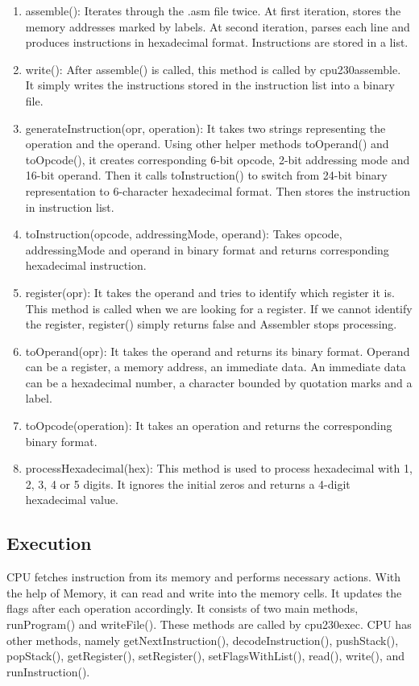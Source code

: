 \documentclass[12pt,a4paper]{article}
\begin{document}
\begin{enumerate}
    \item assemble(): Iterates through the .asm file twice. At first iteration, stores the memory addresses marked by labels. At second iteration, parses each line and produces instructions in hexadecimal format. Instructions are stored in a list.
    \item write(): After assemble() is called, this method is called by cpu230assemble. It simply writes the instructions stored in the instruction list into a binary file.
    \item generateInstruction(opr, operation): It takes two strings representing the operation and the operand. Using other helper methods toOperand() and toOpcode(), it creates corresponding 6-bit opcode, 2-bit addressing mode and 16-bit operand. Then it calls toInstruction() to switch from 24-bit binary representation to 6-character hexadecimal format. Then stores the instruction in instruction list.
    \item toInstruction(opcode, addressingMode, operand): Takes opcode, addressingMode and operand in binary format and returns corresponding hexadecimal instruction.
    \item register(opr): It takes the operand and tries to identify which register it is. This method is called when we are looking for a register. If we cannot identify the register, register() simply returns false and Assembler stops processing.
    \item toOperand(opr): It takes the operand and returns its binary format. Operand can be a register, a memory address, an immediate data. An immediate data can be a hexadecimal number, a character bounded by quotation marks and a label.
    \item toOpcode(operation): It takes an operation and returns the corresponding binary format.
    \item processHexadecimal(hex): This method is used to process hexadecimal with 1, 2, 3, 4 or 5 digits. It ignores the initial zeros and returns a 4-digit hexadecimal value.
\end{enumerate}

\subsection{Execution}

CPU fetches instruction from its memory and performs necessary actions. With the help of Memory, it can read and write into the memory cells. It updates the flags after each operation accordingly. It consists of two main methods, runProgram() and writeFile(). These methods are called by cpu230exec. CPU has other methods, namely getNextInstruction(), decodeInstruction(), pushStack(), popStack(), getRegister(), setRegister(), setFlagsWithList(), read(), write(), and runInstruction().
\end{document}
